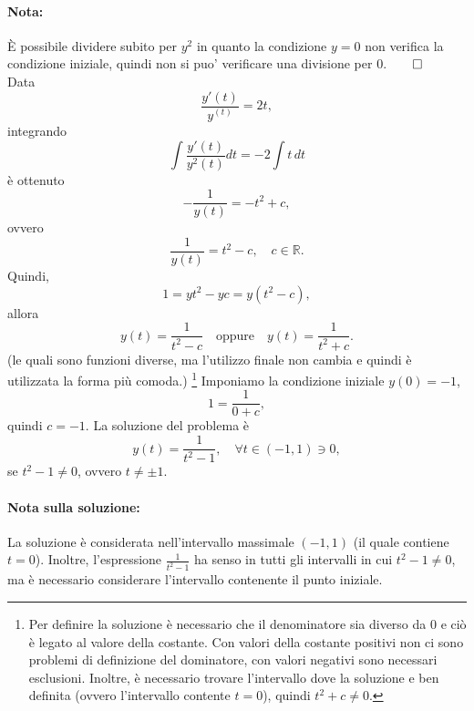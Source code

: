 \begin{example}
    \paragraph{Nota:} È possibile dividere subito per $y^2$ in quanto la condizione $y=0$ non verifica la condizione iniziale, quindi non si puo' verificare una divisione per 0.$\qed$\\
    Data
    \begin{equation*}
    	\frac{y'(t)}{y^(t)}=2t,
    \end{equation*}
    integrando
    \begin{equation*}
    	\int\frac{y'(t)}{y^2(t)}dt=-2\int t\, dt
    \end{equation*}
    è ottenuto
    \begin{equation*}
    	-\frac{1}{y(t)} = -t^2+c,
    \end{equation*}
    ovvero
    \begin{equation*}
	\frac{1}{y(t)} = t^2-c,\quad c\in\mathbb{R}.
    \end{equation*}
    Quindi,
    \begin{equation*}
        1 = y t^2 - yc = y(t^2-c),
    \end{equation*}
    allora
    \begin{equation*}
        y(t) = \frac{1}{t^2-c}\quad\text{oppure}\quad y(t) = \frac{1}{t^2+c}.
    \end{equation*}
    (le quali sono funzioni diverse, ma l'utilizzo finale non cambia e quindi è utilizzata la forma più comoda.)
    \footnote{Per definire la soluzione è necessario che il denominatore sia diverso da 0 e ciò è legato al valore della costante. Con valori della costante positivi non ci sono problemi di definizione del dominatore, con valori negativi sono necessari esclusioni. Inoltre, è necessario trovare l'intervallo dove la soluzione e ben definita (ovvero l'intervallo contente $t=0$), quindi $t^2+c\neq 0$.}
    Imponiamo la condizione iniziale $y(0) = -1$,
    \begin{equation*}
        1=\frac{1}{0+c},
    \end{equation*}
    quindi $c=-1$. La soluzione del problema è
    \begin{equation*}
        y(t) = \frac{1}{t^2 -1},\quad \forall t\in(-1,1)\ni 0,
    \end{equation*}
    se $t^2 -1\neq 0$, ovvero $t\neq \pm 1$.
    \paragraph{Nota sulla soluzione:} La soluzione è considerata nell'intervallo massimale $(-1, 1)$ (il quale contiene $t=0$). Inoltre, l'espressione $\frac{1}{t^2 -1}$ ha senso in tutti gli intervalli in cui $t^2-1\neq 0$, ma è necessario considerare l'intervallo contenente il punto iniziale.
\end{example}

